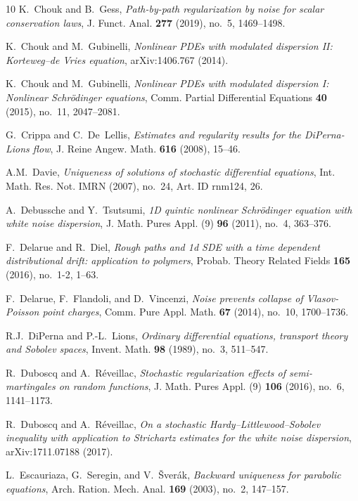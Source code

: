 \documentclass[a4paper,10pt]{article}
\newcommand\1{\mathbbm{1}}
\numberwithin{equation}{section}
\begin{document}
\begin{thebibliography}{10}
K.~Chouk and B.~Gess, \emph{Path-by-path regularization by noise for scalar
  conservation laws}, J. Funct. Anal. \textbf{277} (2019), no.~5,
  1469--1498.

K.~Chouk and M.~Gubinelli, \emph{Nonlinear {PDE}s with modulated dispersion
  {II}: {K}orteweg--de {V}ries equation}, arXiv:1406.767 (2014).

K.~Chouk and M.~Gubinelli, \emph{Nonlinear {PDE}s with modulated dispersion {I}: {N}onlinear {S}chr\"odinger equations}, Comm. Partial Differential Equations \textbf{40} (2015), no.~11, 2047--2081.

G.~Crippa and C.~De~Lellis, \emph{Estimates and regularity results for the
  {D}i{P}erna-{L}ions flow}, J. Reine Angew. Math. \textbf{616} (2008), 15--46.

A.M.~Davie, \emph{Uniqueness of solutions of stochastic differential
  equations}, Int. Math. Res. Not. IMRN (2007), no.~24, Art. ID rnm124, 26.

A.~Debussche and Y.~Tsutsumi, \emph{1{D} quintic nonlinear {S}chr\"odinger
  equation with white noise dispersion}, J. Math. Pures Appl. (9) \textbf{96} (2011), no.~4, 363--376.

F.~Delarue and R.~Diel, \emph{Rough paths and 1d {SDE} with a time dependent
  distributional drift: application to polymers}, Probab. Theory Related Fields \textbf{165} (2016), no.~1-2, 1--63.

F.~Delarue, F.~Flandoli, and D.~Vincenzi, \emph{Noise prevents collapse of
  {V}lasov-{P}oisson point charges}, Comm. Pure Appl. Math. \textbf{67} (2014), no.~10, 1700--1736.

R.J.~DiPerna and P.-L.~Lions, \emph{Ordinary differential equations, transport theory and {S}obolev spaces}, Invent. Math. \textbf{98} (1989), no.~3, 511--547.

R.~Duboscq and A.~R\'{e}veillac, \emph{Stochastic regularization effects of
  semi-martingales on random functions}, J. Math. Pures Appl. (9) \textbf{106} (2016), no.~6, 1141--1173.

R.~Duboscq and A.~R\'{e}veillac, \emph{On a stochastic {H}ardy--{L}ittlewood--{S}obolev inequality with application to {S}trichartz estimates for the white noise dispersion}, arXiv:1711.07188 (2017).

L.~Escauriaza, G.~Seregin, and V.~\v{S}ver\'{a}k, \emph{Backward uniqueness for parabolic equations}, Arch. Ration. Mech. Anal. \textbf{169} (2003), no.~2, 147--157.


\end{thebibliography}
\end{document}
